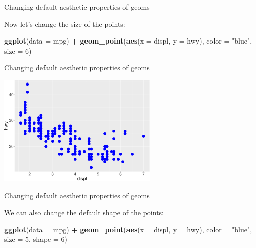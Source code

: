 \documentclass[ignorenonframetext,]{beamer}
\newenvironment{Shaded}{\begin{snugshade}}{\end{snugshade}}
\newcommand{\DataTypeTok}[1]{\textcolor[rgb]{0.13,0.29,0.53}{#1}}
\newcommand{\DecValTok}[1]{\textcolor[rgb]{0.00,0.00,0.81}{#1}}
\newcommand{\KeywordTok}[1]{\textcolor[rgb]{0.13,0.29,0.53}{\textbf{#1}}}
\newcommand{\NormalTok}[1]{#1}
\newcommand{\OperatorTok}[1]{\textcolor[rgb]{0.81,0.36,0.00}{\textbf{#1}}}
\newcommand{\StringTok}[1]{\textcolor[rgb]{0.31,0.60,0.02}{#1}}
\begin{document}
\begin{frame}[fragile]{Changing default aesthetic properties of geoms}
\protect\hypertarget{changing-default-aesthetic-properties-of-geoms-4}{}

Now let's change the size of the points:

\begin{Shaded}
\begin{Highlighting}[]
\KeywordTok{ggplot}\NormalTok{(}\DataTypeTok{data =}\NormalTok{ mpg) }\OperatorTok{+}
\StringTok{  }\KeywordTok{geom_point}\NormalTok{(}\KeywordTok{aes}\NormalTok{(}\DataTypeTok{x =}\NormalTok{ displ, }\DataTypeTok{y =}\NormalTok{ hwy), }
    \DataTypeTok{color =} \StringTok{"blue"}\NormalTok{,}
    \DataTypeTok{size =} \DecValTok{6}\NormalTok{)}
\end{Highlighting}
\end{Shaded}

\end{frame}

\begin{frame}{Changing default aesthetic properties of geoms}
\protect\hypertarget{changing-default-aesthetic-properties-of-geoms-5}{}

\begin{center}\includegraphics[height=200px]{data-visualization_files/figure-beamer/unnamed-chunk-41-1} \end{center}

\end{frame}

\begin{frame}[fragile]{Changing default aesthetic properties of geoms}
\protect\hypertarget{changing-default-aesthetic-properties-of-geoms-6}{}

We can also change the default shape of the points:

\begin{Shaded}
\begin{Highlighting}[]
\KeywordTok{ggplot}\NormalTok{(}\DataTypeTok{data =}\NormalTok{ mpg) }\OperatorTok{+}\StringTok{ }
\StringTok{  }\KeywordTok{geom_point}\NormalTok{(}\KeywordTok{aes}\NormalTok{(}\DataTypeTok{x =}\NormalTok{ displ, }\DataTypeTok{y =}\NormalTok{ hwy), }
    \DataTypeTok{color =} \StringTok{"blue"}\NormalTok{,}
    \DataTypeTok{size =} \DecValTok{5}\NormalTok{,}
    \DataTypeTok{shape =} \DecValTok{6}\NormalTok{)}
\end{Highlighting}
\end{Shaded}

\end{frame}
\end{document}
